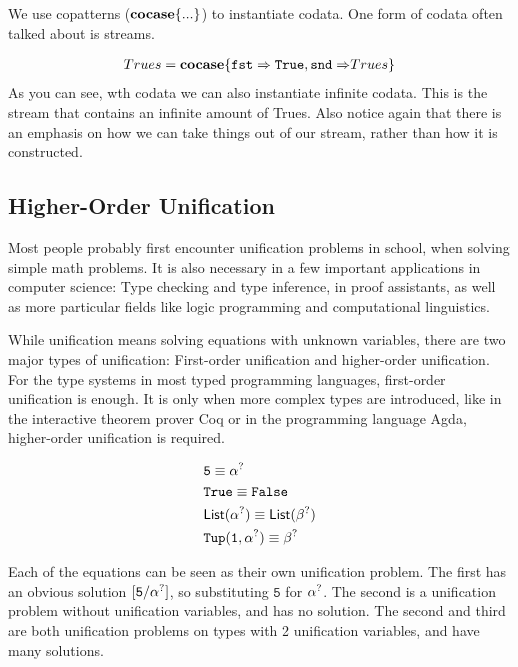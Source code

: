 \documentclass[twoside,12pt,a4paper]{article}
\begin{document}
We use copatterns ($\textbf{cocase}\{...\}$) to instantiate codata.
One form of codata often talked about is streams.
\begin{example}[Streams]
    \begin{align*}
        Trues = \textbf{cocase}\{\mathtt{fst \Rightarrow True, snd \Rightarrow} Trues\}
    \end{align*}
    As you can see, wth codata we can also instantiate infinite codata. 
    This is the stream that contains an infinite amount of Trues.
    Also notice again that there is an emphasis on how we can take things out of our stream, rather than how it is constructed.
\end{example}

\subsection{Higher-Order Unification}
Most people probably first encounter unification problems in school, when solving simple math problems.
It is also necessary in a few important applications in computer science: 
Type checking and type inference, in proof assistants, as well as more particular fields like logic programming and computational linguistics.

While unification means solving equations with unknown variables, there are two major types of unification: First-order unification and higher-order unification.
For the type systems in most typed programming languages, first-order unification is enough. It is only when more complex types are introduced, 
like in the interactive theorem prover Coq or in the programming language Agda, higher-order unification is required.

\begin{example}
    \begin{align*}
        &\mathtt{5} \equiv \alpha^?\\
        &\mathtt{True \equiv False}\\
        &\mathsf{List(\alpha^?)\equiv List(\beta^?)}\\
        &\mathtt{Tup(1,\alpha^?)}\equiv \beta^?
    \end{align*}
\end{example}

Each of the equations can be seen as their own unification problem.
The first has an obvious solution $[\mathtt{5/\alpha^?}]$, so substituting $\mathtt{5}$ for $\alpha^?$.
The second is a unification problem without unification variables, and has no solution.
The second and third are both unification problems on types with 2 unification variables, and have many solutions.
\end{document}
